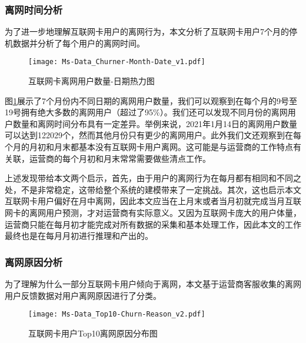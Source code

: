 \par
\subsubsection{离网时间分析}
为了进一步地理解互联网卡用户的离网行为，本文分析了互联网卡用户7个月的停机数据并分析了每个用户的离网时间。\par

\begin{figure}[hbt]
	\centering
	\texttt{[image: Ms-Data\_Churner-Month-Date\_v1.pdf]}
	\caption{互联网卡离网用户数量-日期热力图}
	\label{Fig:Churner-Month-Date}
\end{figure}
图\ref{Fig:Churner-Month-Date}展示了7个月份内不同日期的离网用户数量，我们可以观察到在每个月的9号至19号拥有绝大多数的离网用户（超过了95\%）。我们还可以发现不同月份的离网用户数量和离网时间分布具有一定差异。举例来说，2021年1月14日的离网用户数量可以达到122029个，然而其他月份只有更少的离网用户。此外我们文还观察到在每个月的月初和月末都基本没有互联网卡用户离网。这可能是与运营商的工作特点有关联，运营商的每个月初和月末常常需要做些清点工作。\par
上述发现带给本文两个启示，首先，由于用户的离网行为在每月都有相同和不同之处，不是非常稳定，这带给整个系统的建模带来了一定挑战。其次，这也启示本文互联网卡用户偏好在月中离网，因此本文应当在上月末或者当月初就完成当月互联网卡的离网用户预测，才对运营商有实际意义。又因为互联网卡庞大的用户体量，运营商只能在每月初才能完成对所有数据的采集和基本处理工作，因此本文的工作最终也是在每月月初进行推理和产出的。


\subsubsection{离网原因分析}
为了理解为什么一部分互联网卡用户倾向于离网，本文基于运营商客服收集的离网用户反馈数据对用户离网原因进行了分类。\par
\begin{figure}[hbt]
	\centering
	\texttt{[image: Ms-Data\_Top10-Churn-Reason\_v2.pdf]}
	\caption{互联网卡用户Top10离网原因分布图}
	\label{Fig:Top10-Churn-Reason}
\end{figure}

